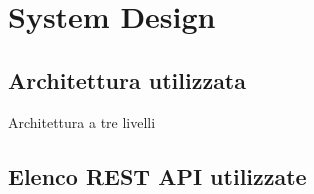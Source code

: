 
\chapter{System Design}
    \section{Architettura utilizzata}
        Architettura a tre livelli

    \section{Elenco REST API utilizzate}